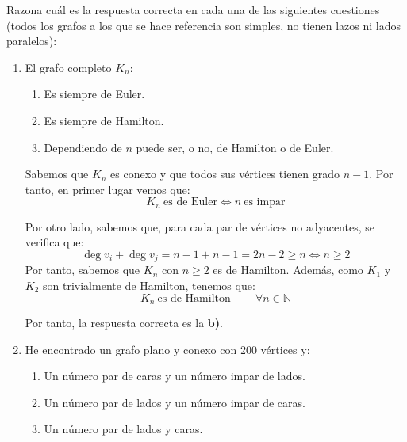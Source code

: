 \begin{ejercicio}\label{ej:1.25}
    Razona cuál es la respuesta correcta en cada una de las siguientes cuestiones (todos los grafos a los que se hace referencia son simples, no tienen lazos ni lados paralelos):
    \begin{enumerate}
        \item El grafo completo $K_n$:
        \begin{enumerate}
            \item Es siempre de Euler.
            \item Es siempre de Hamilton.
            \item Dependiendo de $n$ puede ser, o no, de Hamilton o de Euler.
        \end{enumerate}

        Sabemos que $K_n$ es conexo y que todos sus vértices tienen grado $n-1$. Por tanto, en primer lugar vemos que:
        \begin{equation*}
            K_n\ \text{es de Euler} \iff n\ \text{es impar}
        \end{equation*}

        Por otro lado, sabemos que, para cada par de vértices no adyacentes, se verifica que:
        \begin{equation*}
            \deg v_i + \deg v_j = n-1 + n-1 = 2n-2 \geq n\iff n\geq 2
        \end{equation*}
        Por tanto, sabemos que $K_n$ con $n\geq 2$ es de Hamilton. Además, como $K_1$ y $K_2$ son trivialmente de Hamilton, tenemos que:
        \begin{equation*}
            K_n\ \text{es de Hamilton}~\qquad \forall n\in \mathbb{N}
        \end{equation*}

        Por tanto, la respuesta correcta es la \textbf{b)}.
        \item He encontrado un grafo plano y conexo con 200 vértices y:
        \begin{enumerate}
            \item Un número par de caras y un número impar de lados.
            \item Un número par de lados y un número impar de caras.
            \item Un número par de lados y caras.
        \end{enumerate}


\end{enumerate}
\end{ejercicio}
